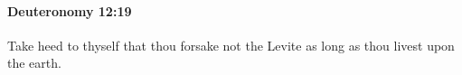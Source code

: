 
		\paragraph{Deuteronomy 12:19} %
			\label{DEUTERONOMY-12-19}

			Take heed to thyself that thou forsake not the Levite as long as thou livest upon the earth.


